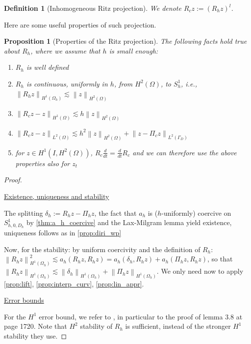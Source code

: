\documentclass[english,a4paper,9pt,oneside]{scrbook}	%
\theoremstyle{break}
\newtheorem{defn}[equation]{Definition}
\newtheorem{prop}[equation]{Proposition}
\newenvironment{mproof}[1][\proofname]{%
  \begin{proof}[#1]$ $\par\nobreak\ignorespaces
}{%
  \end{proof}
}
\renewcommand*{\proofname}{Proof}
\theoremstyle{remark}
\newcommand{\norm}[1]{\left\lVert#1\right\rVert}
\begin{document}
\begin{appendices}
\begin{defn}[Inhomogeneous Ritz projection]
We denote $R_c z := (R_h z)^l$.

\end{defn}

Here are some useful properties of such projection.

\begin{prop}[Properties of the Ritz projection]
\label{prop:ritz}
The following facts hold true about $R_h$, where we assume that $h$ is small enough:

\begin{enumerate}
	\item $R_h$ is well defined
	\item $R_h$ is continuous, uniformly in $h$, from $H^2(\Omega)$, to $S^1_h$, i.e., $\norm{R_hz}_{H^1(\Omega_h)}\lesssim \norm{z}_{H^2(\Omega)}$
	\item $\norm{R_c z - z}_{H^1(\Omega)}\lesssim h\norm{z}_{H^2(\Omega)}$
	\item $\norm{R_c z - z}_{L^2(\Omega)}\lesssim h^2 \norm{z}_{H^2(\Omega)} + \norm{z-\Pi_c z}_{L^2(\Gamma_D)}$
	\item for $z \in H^1(I,H^2(\Omega))$, $R_c \frac{d}{dt} = \frac{d}{dt} R_c$ and we can therefore use the above properties also for $z_t$
\end{enumerate}

\end{prop}

\begin{mproof}

\underline{Existence, uniqueness and stability}

The splitting $\delta_h := R_h z - \Pi_h z$, the fact that $a_h$ is ($h$-uniformly) coercive on $S^1_{h,0,D_h}$ by \cref{thm:a_h_coercive} and the Lax-Milgram lemma yield existence, uniqueness follows as in \cref{prop:diri_wp}

Now, for the stability: by uniform coercivity and the definition of $R_h$: $\norm{R_h z}_{H^1(\Omega_h)}^2 \lesssim a_h(R_h z, R_h z) = a_h(\delta_h,R_h z) + a_h(\Pi_h z, R_h z)$, so that $\norm{R_h z}_{H^1(\Omega_h)} \lesssim \norm{\delta_h }_{H^1(\Omega_h)} + \norm{\Pi_h z }_{H^1(\Omega_h)}$. We only need now to apply \cref{prop:lift}, \cref{prop:interp_curv}, \cref{prop:lin_appr}.

\underline{Error bounds}

For the $H^1$ error bound, we refer to \cite{ranner}, in particular to the proof of lemma 3.8 at page 1720. Note that $H^2$ stability of $R_h$ is sufficient, instead of the stronger $H^1$ stability they use.


\end{mproof}
\end{appendices}
\end{document}
